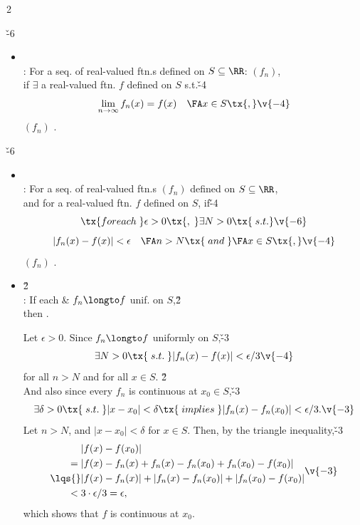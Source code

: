 \documentclass[dvipdfmx,a4paper,titlepage,9pt]{jsarticle}
\begin{document}
\begin{multicols*}{2}
\vfill\null\columnbreak


\v{-6}
\begin{itemize}[label={-}]
\item{} \\
: For a seq.\! of real-valued ftn.s defined on $S\subseteq\RR$: $(f_n)$, \\
\;\;if $\exists$ a real-valued ftn. $f$ defined on $S$ s.t.\v{-4}
$$\lim_{n\to\infty}f_n(x)=f(x)\quad\FA x\in S\tx{,}\v{-4}$$
$(f_n)$ . \\
\end{itemize}

\v{-6}
\begin{itemize}[label={-}]
\item{} \\
: For a seq.\! of real-valued ftn.s $(f_n)$ defined on $S\subseteq\RR$,\\
\;\;and for a real-valued ftn.\! $f$ defined on $S$, if\v{-4}
$$\tx{for each\;}\epsilon>0\tx{,\;}\exists N>0\tx{\;s.t.}\v{-6}$$
$$|f_n(x)-f(x)|<\epsilon\quad\FA n>N\tx{\;and\;}\FA x\in S\tx{,}\v{-4}$$
\;\;$(f_n)$ . \\

\item{}\v2 \\
: If each  \& $f_n\longto f$ unif. on $S$,\v2\\
\;\;then .
\begin{Pfbox}
Let $\epsilon>0$. Since $f_n\longto f$ uniformly on $S$,\v{-3}
$$\exists N>0\tx{\;s.t.\;}|f_n(x)-f(x)|<\epsilon/3\v{-4}$$
for all $n>N$ and for all $x\in S$. \v2\\
And also since every $f_n$ is continuous at $x_0\in S$,\v{-3}
$$\exists\delta>0\tx{\;s.t.\;}|x-x_0|<\delta\tx{\;implies\;}|f_n(x)-f_n(x_0)|<\epsilon/3.\v{-3}$$
Let $n>N$, and $|x-x_0|<\delta$ for $x\in S$. Then, by the triangle inequality,\v{-3}
$$\begin{aligned}
        &|f(x)-f(x_0)| \\
     ={}&|f(x)-f_n(x)+f_n(x)-f_n(x_0)+f_n(x_0)-f(x_0)| \\
  \lqs{}&|f(x)-f_n(x)|+|f_n(x)-f_n(x_0)|+|f_n(x_0)-f(x_0)| \\
     <{}&3\cdot\epsilon/3=\epsilon,
  \end{aligned}\v{-3}$$
which shows that $f$ is continuous at $x_0$.
\end{Pfbox}


\end{itemize}
\end{multicols*}
\end{document}
